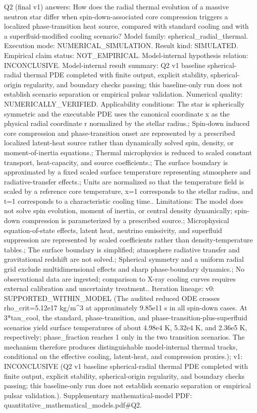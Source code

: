 \documentclass[conference]{IEEEtran}
\begin{document}
Q2 (final v1) answers: How does the radial thermal evolution of a massive neutron star differ when spin-down-associated core compression triggers a localized phase-transition heat source, compared with standard cooling and with a superfluid-modified cooling scenario? Model family: spherical\_radial\_thermal. Execution mode: NUMERICAL\_SIMULATION. Result kind: SIMULATED. Empirical claim status: NOT\_EMPIRICAL. Model-internal hypothesis relation: INCONCLUSIVE. Model-internal result summary: Q2 v1 baseline spherical-radial thermal PDE completed with finite output, explicit stability, spherical-origin regularity, and boundary checks passing; this baseline-only run does not establish scenario separation or empirical pulsar validation. Numerical quality: NUMERICALLY\_VERIFIED. Applicability conditions: The star is spherically symmetric and the executable PDE uses the canonical coordinate x as the physical radial coordinate r normalized by the stellar radius.; Spin-down induced core compression and phase-transition onset are represented by a prescribed localized latent-heat source rather than dynamically solved spin, density, or moment-of-inertia equations.; Thermal microphysics is reduced to scaled constant transport, heat-capacity, and source coefficients.; The surface boundary is approximated by a fixed scaled surface temperature representing atmosphere and radiative-transfer effects.; Units are normalized so that the temperature field is scaled by a reference core temperature, x=1 corresponds to the stellar radius, and t=1 corresponds to a characteristic cooling time.. Limitations: The model does not solve spin evolution, moment of inertia, or central density dynamically; spin-down compression is parameterized by a prescribed source.; Microphysical equation-of-state effects, latent heat, neutrino emissivity, and superfluid suppression are represented by scaled coefficients rather than density-temperature tables.; The surface boundary is simplified; atmosphere radiative transfer and gravitational redshift are not solved.; Spherical symmetry and a uniform radial grid exclude multidimensional effects and sharp phase-boundary dynamics.; No observational data are ingested; comparison to X-ray cooling curves requires external calibration and uncertainty treatment.. Iteration lineage: v0: SUPPORTED\_WITHIN\_MODEL (The audited reduced ODE crosses rho\_crit=5.12e17 kg/m\textasciicircum{}3 at approximately 9.85e11 s in all spin-down cases. At 3*tau\_cool, the standard, phase-transition, and phase-transition-plus-superfluid scenarios yield surface temperatures of about 4.98e4 K, 5.32e4 K, and 2.36e5 K, respectively; phase\_fraction reaches 1 only in the two transition scenarios. The mechanism therefore produces distinguishable model-internal thermal tracks, conditional on the effective cooling, latent-heat, and compression proxies.); v1: INCONCLUSIVE (Q2 v1 baseline spherical-radial thermal PDE completed with finite output, explicit stability, spherical-origin regularity, and boundary checks passing; this baseline-only run does not establish scenario separation or empirical pulsar validation.). Supplementary mathematical-model PDF: quantitative\_mathematical\_models.pdf\#Q2.
\end{document}
